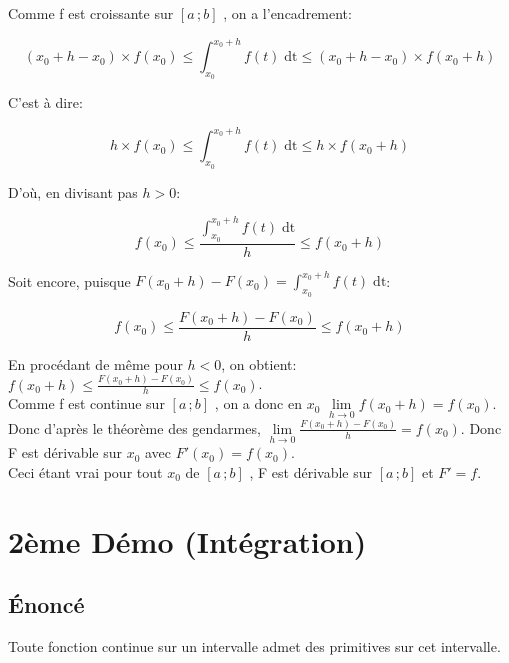 \documentclass[12px]{article}
\newcommand\I{$[a\,;b]$ }
\newcommand\xo{x_{0} }
\newcommand\dt{f(t)\;\mathrm{dt}}
\begin{document}
	Comme f est croissante sur \I, on a l'encadrement:
	\begin{center}
		\begin{displaymath}
			(\xo +h -\xo ) \times f(\xo) 
				\leq 
			\int_{\xo}^{\xo +h}\dt 
				\leq 
			(\xo +h -\xo) \times f(\xo +h)
		\end{displaymath}
	\end{center}
	C'est à dire:
	\begin{center}
		\begin{displaymath}
			h \times f(\xo) 
			\leq 
			\int_{\xo}^{\xo +h}\dt 
			\leq 
			h \times f(\xo +h)
		\end{displaymath}
	\end{center}
	D'où, en divisant pas $h>0$:
	\begin{center}
		\begin{displaymath}
			f(\xo) \leq \frac{\int_{\xo}^{\xo +h}\dt}{h} \leq f(\xo +h)
		\end{displaymath}
	\end{center}
	Soit encore, puisque $F(\xo +h) - F(\xo) = \int_{\xo}^{\xo +h}\dt$:
	\begin{center}
		\begin{displaymath}
			f(\xo) \leq \frac{F(\xo +h) - F(\xo)}{h} \leq f(\xo +h)
		\end{displaymath}
	\end{center}
	En procédant de même pour $h<0$, on obtient:
	$f(\xo +h) \leq \frac{F(\xo +h) - F(\xo)}{h} \leq f(\xo)$.\\
	Comme f est continue sur \I, on a donc en $\xo$ 
	$\lim\limits_{h \rightarrow 0} f(\xo +h) = f(\xo)$.\\
	Donc d'après le théorème des gendarmes, 
	$\lim\limits_{h \rightarrow 0}\frac{F(\xo +h) - F(\xo)}{h} = f(\xo)$.
	Donc F est dérivable sur $\xo$ avec $F'(\xo) = f(\xo)$.\\
	Ceci étant vrai pour tout $\xo$ de \I, F est dérivable sur \I et $F'=f$.
	
	
	\section{2ème Démo (Intégration)}
	
	\subsection{\'Enoncé}
	Toute fonction continue sur un intervalle admet des primitives sur cet intervalle.
	
\end{document}
